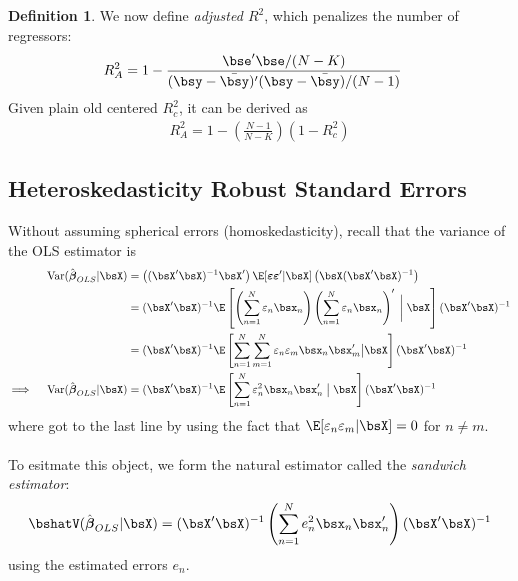 \documentclass[12pt]{article}
\theoremstyle{plain}
\theoremstyle{definition}
\newtheorem{defn}[thm]{Definition}
\theoremstyle{remark}
\newcommand{\bsvarepsilon}{\boldsymbol{\varepsilon}}
\newcommand{\bsbeta}{\boldsymbol{\beta}}
\newcommand{\Var}{\operatorname{Var}}
\newcommand{\sumnN}{\sum^N_{n=1}}
\begin{document}
\begin{defn}
We now define \emph{adjusted $R^2$}, which penalizes the number of
regressors:
\begin{align*}
  R^2_A
  &= 1 -
  \frac{\bse'\bse/(N-K)}{(\bsy-\bar{\bsy})'(\bsy-\bar{\bsy})/(N-1)}
\end{align*}
Given plain old centered $R^2_c$, it can be derived as
\begin{align*}
  R^2_A =
  1 -
  \left(\frac{N-1}{N-K}\right)
  \left(1 - R^2_c\right)
\end{align*}
\end{defn}

\clearpage
\subsection{Heteroskedasticity Robust Standard Errors}

Without assuming spherical errors (homoskedasticity), recall that
the variance of the OLS estimator is
\begin{align*}
  \Var(\hat{\bsbeta}_{OLS}|\bsX)
  &=
  \left((\bsX'\bsX)^{-1}\bsX'\right)
  \E[\bsvarepsilon\bsvarepsilon' |\bsX]
  \left(\bsX(\bsX'\bsX)^{-1}\right) \\
  &=
  (\bsX'\bsX)^{-1}
  \E\left[
  \left(
  \sumnN \varepsilon_n \bsx_n
  \right)
  \left(
  \sumnN \varepsilon_n \bsx_n
  \right)'
  \;\bigg|\;\bsX
  \right]
  (\bsX'\bsX)^{-1} \\
  &=
  (\bsX'\bsX)^{-1}
  \E\left[
  \sumnN
  \sum_{m=1}^N
  \varepsilon_n\varepsilon_m \bsx_n\bsx_m'
  \big|\bsX
  \right]
  (\bsX'\bsX)^{-1} \\
  \implies\quad
  \Var(\hat{\bsbeta}_{OLS}|\bsX)
  &=
  (\bsX'\bsX)^{-1}
  \E\left[
  \sumnN
  \varepsilon_n^2 \bsx_n\bsx_n'
  \;\big|\;\bsX
  \right]
  (\bsX'\bsX)^{-1}
\end{align*}
where got to the last line by using the fact that
$\E[\varepsilon_n\varepsilon_m|\bsX]=0$ for $n\neq m$.
\\
\\
To esitmate this object, we form the natural estimator called the
\emph{sandwich estimator}:
\begin{align*}
  \bshatV(\hat{\bsbeta}_{OLS}|\bsX)
  =
  (\bsX'\bsX)^{-1}
  \left(
  \sumnN
  e_n^2 \bsx_n\bsx_n'
  \right)
  (\bsX'\bsX)^{-1}
\end{align*}
using the estimated errors $e_n$.
\end{document}
